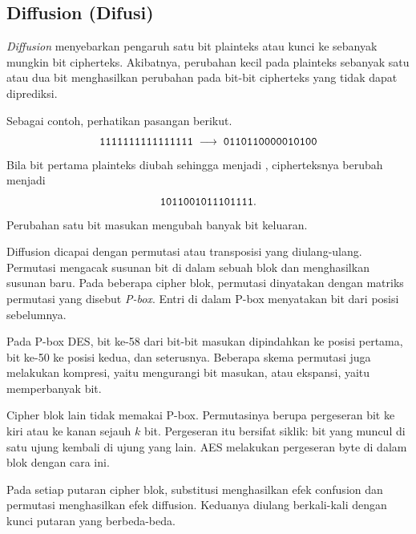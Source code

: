 \subsection{Diffusion (Difusi)}

\textit{Diffusion} menyebarkan pengaruh satu bit plainteks atau kunci ke
sebanyak mungkin bit cipherteks. Akibatnya, perubahan kecil pada plainteks
sebanyak satu atau dua bit menghasilkan perubahan pada bit-bit cipherteks yang
tidak dapat diprediksi.

Sebagai contoh, perhatikan pasangan berikut.
\[
\texttt{1111111111111111} \;\longrightarrow\; \texttt{0110110000010100}
\]
Bila bit pertama plainteks diubah sehingga menjadi ,
cipherteksnya berubah menjadi
\[
\texttt{1011001011101111}.
\]
Perubahan satu bit masukan mengubah banyak bit keluaran.

Diffusion dicapai dengan permutasi atau transposisi yang diulang-ulang.
Permutasi mengacak susunan bit di dalam sebuah blok dan menghasilkan susunan
baru. Pada beberapa cipher blok, permutasi dinyatakan dengan matriks permutasi
yang disebut \textit{P-box}. Entri di dalam P-box menyatakan bit dari posisi
sebelumnya.

Pada P-box DES, bit ke-58 dari bit-bit masukan dipindahkan ke posisi pertama,
bit ke-50 ke posisi kedua, dan seterusnya. Beberapa skema permutasi juga
melakukan kompresi, yaitu mengurangi bit masukan, atau ekspansi, yaitu
memperbanyak bit.

Cipher blok lain tidak memakai P-box. Permutasinya berupa pergeseran bit ke
kiri atau ke kanan sejauh $k$ bit. Pergeseran itu bersifat siklik: bit yang
muncul di satu ujung kembali di ujung yang lain. AES melakukan pergeseran byte
di dalam blok dengan cara ini.

Pada setiap putaran cipher blok, substitusi menghasilkan efek confusion dan
permutasi menghasilkan efek diffusion. Keduanya diulang berkali-kali dengan
kunci putaran yang berbeda-beda.
